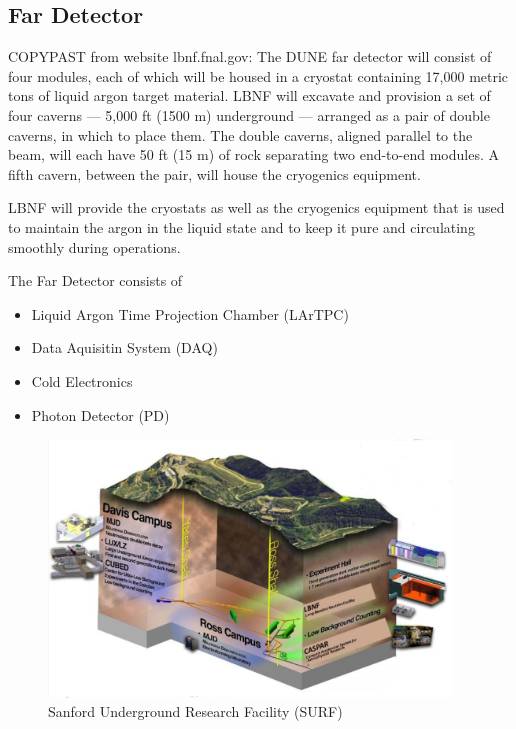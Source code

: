 \subsection{Far Detector}

COPYPAST from website lbnf.fnal.gov:  The DUNE far detector will consist of four modules, each of which will be housed in a cryostat containing 17,000 metric tons of liquid argon target material. LBNF will excavate and provision a set of four caverns — 5,000 ft (1500 m) underground — arranged as a pair of double caverns, in which to place them. The double caverns, aligned parallel to the beam, will each have 50 ft (15 m) of rock separating two end-to-end modules. A fifth cavern, between the pair, will house the cryogenics equipment.

LBNF will provide the cryostats as well as the cryogenics equipment that is used to maintain the argon in the liquid state and to keep it pure and circulating smoothly during operations. 

The Far Detector consists of 
\begin{itemize}
  \item Liquid Argon Time Projection Chamber (LArTPC)
  \item Data Aquisitin System (DAQ)
  \item Cold Electronics
  \item Photon Detector (PD)
\end{itemize}

\begin{figure}
\caption{Sanford Underground Research Facility (SURF)}
\label{fig:farDetector_SURF1}
\centering
\includegraphics[width=0.95\textwidth, keepaspectratio=true]{figs/farDetector_SanfordUndergroundResearchFacility.png}
\end{figure}

